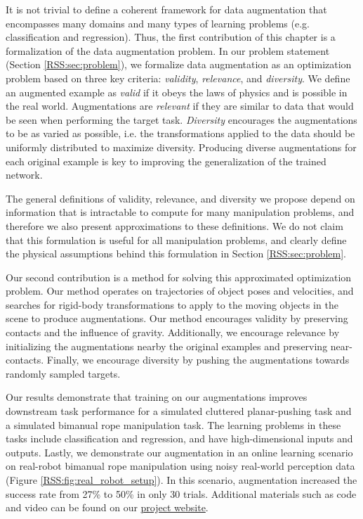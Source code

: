 It is not trivial to define a coherent framework for data augmentation that encompasses many domains and many types of learning problems (e.g. classification and regression). Thus, the first contribution of this chapter is a formalization of the data augmentation problem. In our problem statement (Section \ref{RSS:sec:problem}), we formalize data augmentation as an optimization problem based on three key criteria: \textit{validity}, \textit{relevance}, and \textit{diversity}. We define an augmented example as \textit{valid} if it obeys the laws of physics and is possible in the real world. Augmentations are \textit{relevant} if they are similar to data that would be seen when performing the target task. \textit{Diversity} encourages the augmentations to be as varied as possible, i.e. the transformations applied to the data should be uniformly distributed to maximize diversity. Producing diverse augmentations for each original example is key to improving the generalization of the trained network.

The general definitions of validity, relevance, and diversity we propose depend on information that is intractable to compute for many manipulation problems, and therefore we also present approximations to these definitions. We do not claim that this formulation is useful for all manipulation problems, and clearly define the physical assumptions behind this formulation in Section \ref{RSS:sec:problem}.

Our second contribution is a method for solving this approximated optimization problem. Our method operates on trajectories of object poses and velocities, and searches for rigid-body transformations to apply to the moving objects in the scene to produce augmentations. Our method encourages validity by preserving contacts and the influence of gravity. Additionally, we encourage relevance by initializing the augmentations nearby the original examples and preserving near-contacts. Finally, we encourage diversity by pushing the augmentations towards randomly sampled targets.

Our results demonstrate that training on our augmentations improves downstream task performance for a simulated cluttered planar-pushing task and a simulated bimanual rope manipulation task. The learning problems in these tasks include classification and regression, and have high-dimensional inputs and outputs. Lastly, we demonstrate our augmentation in an online learning scenario on real-robot bimanual rope manipulation using noisy real-world perception data (Figure \ref{RSS:fig:real_robot_setup}). In this scenario, augmentation increased the success rate from 27\% to 50\% in only 30 trials. Additional materials such as code and video can be found on our \href{https://sites.google.com/view/data-augmentation4manipulation}{project website}.
